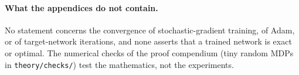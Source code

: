 \paragraph{What the appendices do not contain.}
No statement concerns the convergence of stochastic-gradient training, of Adam, or of target-network iterations, and none asserts that a trained network is exact or optimal.
The numerical checks of the proof compendium (tiny random MDPs in \texttt{theory/checks/}) test the mathematics, not the experiments.

